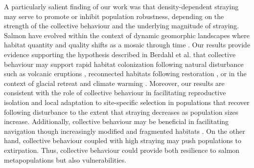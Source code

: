 \documentclass{revtex4}
\begin{document}
A particularly salient finding of our work was that density-dependent straying may serve to promote or inhibit population robustness, depending on the strength of the collective behaviour and the underlying magnitude of straying.
Salmon have evolved within the context of dynamic geomorphic landscapes where habitat quantity and quality shifts as a mosaic through time \citep{Stanford:2017bu}. 
Our results provide evidence supporting the hypothesis described in Berdahl et al. \citep{Berdahl:2014bl} that collective behaviour may support rapid habitat colonization following natural disturbance such as volcanic eruptions \citep{Leider:1989gx}, reconnected habitats following restoration \citep{Pess:2012by,Pess:2014isa}, or in the context of glacial retreat and climate warming \citep{Milner:2008gb}. 
Moreover, our results are consistent with the role of collective behaviour in facilitating reproductive isolation and local adaptation to site-specific selection in populations that recover following disturbance to the extent that straying decreases as population sizes increase. 
Additionally, collective behaviour may be beneficial in facilitating navigation though increasingly modified and fragmented habitats \citep{Berdahl:2017uu}. 
On the other hand, collective behaviour coupled with high straying may push populations to extirpation. 
Thus, collective behaviour could provide both resilience to salmon metapopulations but also vulnerabilities.  
\end{document}
